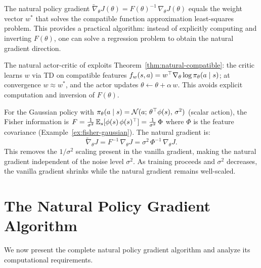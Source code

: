 \documentclass[11pt,a4paper]{article}
\begin{document}
\begin{keyresult}[title={Compatible Features Yield the Natural Gradient}]
The natural policy gradient $\tilde{\nabla}_\theta J(\theta) =
F(\theta)^{-1}\, \nabla_\theta J(\theta)$ equals the weight vector
$w^*$ that solves the compatible function approximation least-squares
problem. This provides a practical algorithm: instead of explicitly
computing and inverting $F(\theta)$, one can solve a regression problem
to obtain the natural gradient direction.
\end{keyresult}

\begin{rlconnection}
The natural actor-critic of \citet{peters2008} exploits
Theorem~\ref{thm:natural-compatible}: the critic learns $w$ via TD on
compatible features $f_w(s,a) = w^\top \nabla_\theta \log
\pi_\theta(a \mid s)$; at convergence $w \approx w^*$, and the
actor updates $\theta \leftarrow \theta + \alpha\, w$. This avoids
explicit computation and inversion of $F(\theta)$.
\end{rlconnection}

\begin{example}
\label{ex:natural-gaussian}
For the Gaussian policy with $\pi_\theta(a \mid s) = \mathcal{N}(a;\,
\theta^\top \phi(s),\, \sigma^2)$ (scalar action), the Fisher
information is $F = \frac{1}{\sigma^2}\, \mathbb{E}_s[\phi(s)\, \phi(s)^\top]
= \frac{1}{\sigma^2}\, \Phi$ where $\Phi$ is the feature covariance
(Example~\ref{ex:fisher-gaussian}). The natural gradient is:
\[
  \tilde{\nabla}_\theta J = F^{-1}\, \nabla_\theta J
  = \sigma^2\, \Phi^{-1}\, \nabla_\theta J.
\]
This removes the $1/\sigma^2$ scaling present in the vanilla gradient,
making the natural gradient independent of the noise level $\sigma^2$.
As training proceeds and $\sigma^2$ decreases, the vanilla gradient
shrinks while the natural gradient remains well-scaled.
\end{example}

\section{The Natural Policy Gradient Algorithm}

We now present the complete natural policy gradient algorithm and
analyze its computational requirements.
\end{document}
